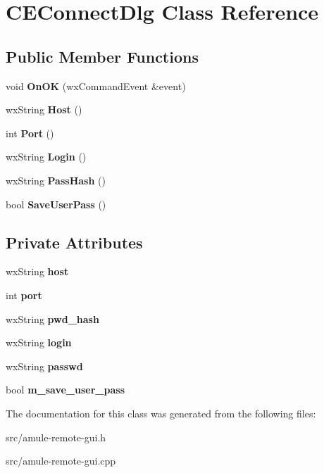 \section{CEConnectDlg Class Reference}
\label{classCEConnectDlg}
\subsection*{Public Member Functions}
\begin{DoxyCompactItemize}
\item 
void {\bfseries OnOK} (wxCommandEvent \&event)\label{classCEConnectDlg_a2e026861cf56a091eea946431f95938a}

\item 
wxString {\bfseries Host} ()\label{classCEConnectDlg_abd99450fbd1852ab7bceadc0fb94cd51}

\item 
int {\bfseries Port} ()\label{classCEConnectDlg_af64d168aeda23373840eeb0d8c21a9da}

\item 
wxString {\bfseries Login} ()\label{classCEConnectDlg_abc30f011bfb1983ce45931c045e59838}

\item 
wxString {\bfseries PassHash} ()\label{classCEConnectDlg_aa30b1f391dd98c1a5095e46ebcef5974}

\item 
bool {\bfseries SaveUserPass} ()\label{classCEConnectDlg_a1bc01b33436f378858cb9fe070ba8f06}

\end{DoxyCompactItemize}
\subsection*{Private Attributes}
\begin{DoxyCompactItemize}
\item 
wxString {\bfseries host}\label{classCEConnectDlg_a3d5a84633591f8319655c24897632f07}

\item 
int {\bfseries port}\label{classCEConnectDlg_a60ee6183b59ec6a3fa5813ac6f360a9c}

\item 
wxString {\bfseries pwd\_\-hash}\label{classCEConnectDlg_a5034c6f6ff2e79b6b7edebe26208b706}

\item 
wxString {\bfseries login}\label{classCEConnectDlg_aac5fd48ba0845c716d7e30f527943f05}

\item 
wxString {\bfseries passwd}\label{classCEConnectDlg_a7bc2db021a34d0fa31a8d7f5945ce596}

\item 
bool {\bfseries m\_\-save\_\-user\_\-pass}\label{classCEConnectDlg_af8fd75176d4fb209f98a9f1c2def9f5a}

\end{DoxyCompactItemize}


The documentation for this class was generated from the following files:\begin{DoxyCompactItemize}
\item 
src/amule-\/remote-\/gui.h\item 
src/amule-\/remote-\/gui.cpp\end{DoxyCompactItemize}
